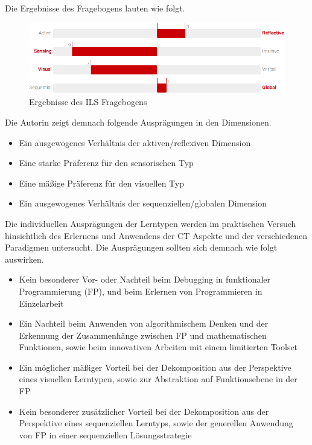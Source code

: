 Die Ergebnisse des Fragebogens lauten wie folgt.

\begin{figure}[H]
    \centering
    \includegraphics[width=1\linewidth]{Figures/Section_4/ILS_result}
    \caption{Ergebnisse des ILS Fragebogens}
\end{figure}

Die Autorin zeigt demnach folgende Ausprägungen in den Dimensionen.

\begin{itemize}
    \item Ein ausgewogenes Verhältnis der aktiven/reflexiven Dimension
    \item Eine starke Präferenz für den sensorischen Typ
    \item Eine mäßige Präferenz für den visuellen Typ
    \item Ein ausgewogenes Verhältnis der sequenziellen/globalen Dimension
\end{itemize}

Die individuellen Ausprägungen der Lerntypen werden im praktischen Versuch hinsichtlich des Erlernens und Anwendens der CT Aspekte und der verschiedenen Paradigmen untersucht.
Die Ausprägungen sollten sich demnach wie folgt auswirken.

\begin{itemize}
    \item Kein besonderer Vor- oder Nachteil beim Debugging in funktionaler Programmierung (FP), und beim Erlernen von Programmieren in Einzelarbeit
    \item Ein Nachteil beim Anwenden von algorithmischem Denken und der Erkennung der Zusammenhänge zwischen FP und mathematischen Funktionen, sowie beim innovativen Arbeiten mit einem limitierten Toolset
    \item Ein möglicher mäßiger Vorteil bei der Dekomposition aus der Perspektive eines visuellen Lerntypen, sowie zur Abstraktion auf Funktionsebene in der FP
    \item Kein besonderer zusätzlicher Vorteil bei der Dekomposition aus der Perspektive eines sequenziellen Lerntyps, sowie der generellen Anwendung von FP in einer sequenziellen Lösungsstrategie
\end{itemize}


